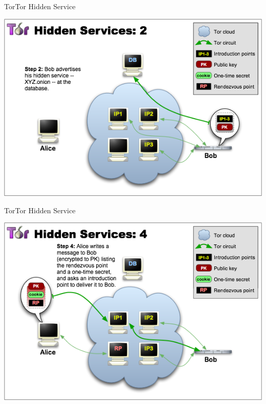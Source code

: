 \begin{frame}{Tor}{Tor Hidden Service}
\begin{center}
	\includegraphics[scale=0.45]{imgs/THS-2.png}
\end{center}
\end{frame}

\begin{frame}{Tor}{Tor Hidden Service}
\begin{center}
	\includegraphics[scale=0.45]{imgs/THS-4.png}
\end{center}
\end{frame}

